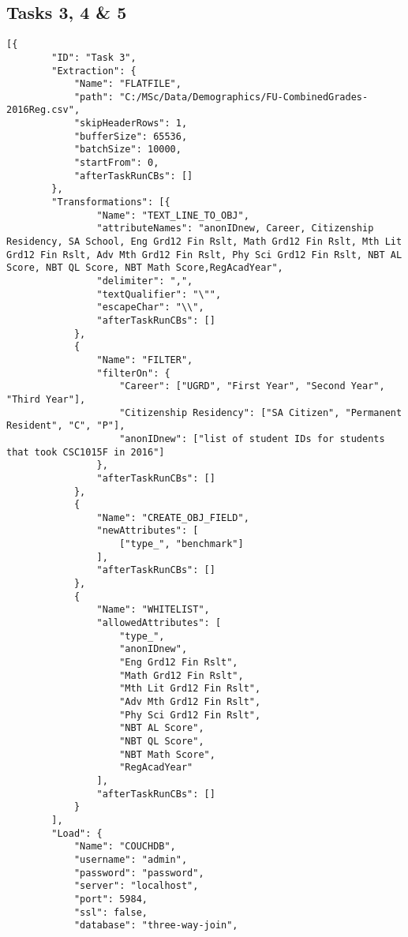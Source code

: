 \subsection{Tasks 3, 4 \& 5}
\label{netl-tasks-3-4-5-config}
\begin{verbatim}
[{
        "ID": "Task 3",
        "Extraction": {
            "Name": "FLATFILE",
            "path": "C:/MSc/Data/Demographics/FU-CombinedGrades-2016Reg.csv",
            "skipHeaderRows": 1,
            "bufferSize": 65536,
            "batchSize": 10000,
            "startFrom": 0,
            "afterTaskRunCBs": []
        },
        "Transformations": [{
                "Name": "TEXT_LINE_TO_OBJ",
                "attributeNames": "anonIDnew, Career, Citizenship Residency, SA School, Eng Grd12 Fin Rslt, Math Grd12 Fin Rslt, Mth Lit Grd12 Fin Rslt, Adv Mth Grd12 Fin Rslt, Phy Sci Grd12 Fin Rslt, NBT AL Score, NBT QL Score, NBT Math Score,RegAcadYear",
                "delimiter": ",",
                "textQualifier": "\"",
                "escapeChar": "\\",
                "afterTaskRunCBs": []
            },
            {
                "Name": "FILTER",
                "filterOn": {
                    "Career": ["UGRD", "First Year", "Second Year", "Third Year"],
                    "Citizenship Residency": ["SA Citizen", "Permanent Resident", "C", "P"],
                    "anonIDnew": ["list of student IDs for students that took CSC1015F in 2016"]
                },
                "afterTaskRunCBs": []
            },
            {
                "Name": "CREATE_OBJ_FIELD",
                "newAttributes": [
                    ["type_", "benchmark"]
                ],
                "afterTaskRunCBs": []
            },
            {
                "Name": "WHITELIST",
                "allowedAttributes": [
                    "type_",
                    "anonIDnew",
                    "Eng Grd12 Fin Rslt",
                    "Math Grd12 Fin Rslt",
                    "Mth Lit Grd12 Fin Rslt",
                    "Adv Mth Grd12 Fin Rslt",
                    "Phy Sci Grd12 Fin Rslt",
                    "NBT AL Score",
                    "NBT QL Score",
                    "NBT Math Score",
                    "RegAcadYear"
                ],
                "afterTaskRunCBs": []
            }
        ],
        "Load": {
            "Name": "COUCHDB",
            "username": "admin",
            "password": "password",
            "server": "localhost",
            "port": 5984,
            "ssl": false,
            "database": "three-way-join",

\end{verbatim}
